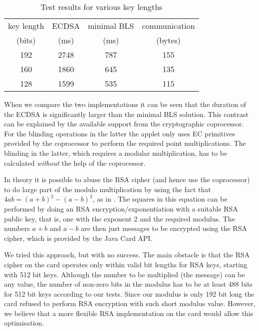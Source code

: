 \begin{table}
  \centering
  \caption{Test results for various key lengths}
  \label{tab:sbc-results}
  \renewcommand{\tabcolsep}{1.25mm}
  \renewcommand{\arraystretch}{1.25}
  \begin{tabular}{| c || c | c || c |}\hline
    key length & ECDSA & minimal BLS & communication \\
    (bits) & (ms) & (ms) & (bytes) \\\hline\hline
    192 & 2748 & 787 & 155 \\\hline
    160 & 1860 & 645 & 135 \\\hline
    128 & 1599 & 535 & 115 \\\hline
  \end{tabular}
\end{table}

When we compare the two implementations it can be seen that the duration of the
ECDSA is significantly larger than the minimal BLS solution. This contrast can
be explained by the available support from the cryptographic coprocessor. For
the blinding operations in the latter the applet only uses EC primitives
provided by the coprocessor to perform the required point multiplications. The
blinding in the latter, which requires a modular multiplication, has to be
calculated \emph{without} the help of the coprocessor.

In theory it is possible to abuse the RSA cipher (and hence use the coprocessor)
to do large part of the modulo multiplication by using the fact that
$4ab = (a+b)^2 - (a-b)^2$, as in \cite{Sterckx09,TewsJacobs09}. The squares in
this equation can be performed by doing an RSA encryption\slash exponentiation
with a suitable RSA public key, that is, one with the exponent 2 and the
required modulus. The numbers $a+b$ and $a-b$ are then just messages to be
encrypted using the RSA cipher, which is provided by the Java Card API.

We tried this approach, but with no success. The main obstacle is that the RSA
cipher on the card operates only within valid bit lengths for RSA keys, starting
with 512 bit keys. Although the number to be multiplied (the message) can be any
value, the number of non-zero bits in the modulus has to be at least 488 bits
for 512 bit keys according to our tests. Since our modulus is only 192 bit long
the card refused to perform RSA encryption with such short modulus value.
However, we believe that a more flexible RSA implementation on the card would
allow this optimisation.

